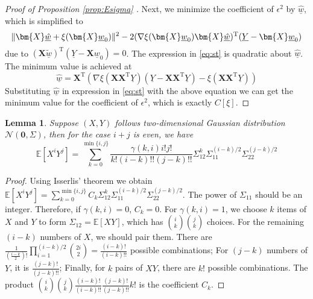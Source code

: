 \documentclass[conference]{IEEEtran}
\newtheorem{lemma}{Lemma}
\DeclarePairedDelimiter\norm{\lVert}{\rVert}
\def\E{\mathbb{E}}
\def\T{\mathrm{T}}
\newcommand{\ide}[2]{ \gamma(#1,#2) }
\begin{document}
\begin{proof}[Proof of Proposition \ref{prop:Esigma} ]
Next, we minimize the coefficient of $\epsilon^2$ by $\underline{\hat{w}}$, which is simplified to 
\begin{equation}\label{eq:st}
\norm{\bm{X}\underline{\hat{w}} + \xi(\bm{X} \underline{w}_0)}^2-
2 (
\nabla \xi(\bm{X} \underline{w}_0)\bm{X}\underline{\hat{w}})^\T(\underline{Y}-\bm{X} \underline{w}_0)
\end{equation}
due to $(\bm{X}\underline{\tilde{w}})^\T (\underline{Y}-\bm{X}\underline{w}_0) = 0 $.
The expression in \eqref{eq:st} is quadratic about $\underline{\hat{w}}$. The minimum value is achieved  at
$$
\underline{\hat{w}} =  \bm{X}^\T(\nabla\xi(\bm{X}\bm{X}^\T \underline{Y})
(\underline{Y}-\bm{X}\bm{X}^\T \underline{Y}) - \xi(\bm{X}\bm{X}^\T \underline{Y}))
$$
Substituting $\underline{\hat{w}}$ in expression in \eqref{eq:st} with the above equation we can get the minimum value for the coefficient of $\epsilon^2$, which is exactly $C[\xi]$.
\end{proof}
\begin{lemma}\label{lemma:Isserlis2}
     Suppose $(X,Y)$ follows two-dimensional Gaussian distribution $\mathcal{N}(\bm{0}, \Sigma)$, then for the case $i+j$ is even, we have
\begin{equation*}
    \E[X^i Y^j] =
    \sum_{k=0}^{\min\{i,j\}}
    \frac{\ide{k}{i} i! j!}{k! (i-k)!!(j-k)!!}
    \Sigma_{12}^k \Sigma_{11}^{(i-k)/2}\Sigma_{22}^{(j-k)/2}
\end{equation*}
\end{lemma}
\begin{proof}
Using Isserlis' theorem \cite{isserlis1918formula} we obtain
$  \E[X^i Y^j] = \sum_{k=0}^{\min\{i,j\}} C_k \Sigma_{12}^k \Sigma_{11}^{(i-k)/2}\Sigma_{22}^{(j-k)/2}$.
The power of $\Sigma_{11}$ should be an integer. Therefore, if $\ide{k}{i} = 0$, $C_k = 0$.
For $\ide{k}{i} = 1$, we choose $k$ items of $X$ and $Y$ to form $\Sigma_{12} = \E[XY]$, which has $\binom{i}{k}\binom{j}{k}$ choices.
For the remaining $(i-k)$ numbers of $X$, we should pair them. There are $\frac{1}{(\frac{i-k}{2})!}\prod_{i=1}^{(i-k)/2} \binom{2i}{2} = \frac{(i-k)!}{(i-k)!!}$ possible combinations; For $(j-k)$ numbers of $Y$, it is $\frac{(j-k)!}{(j-k)!!}$; Finally, for $k$ pairs of $XY$, there are $k!$ possible combinations. The product $\binom{i}{k}\binom{j}{k}\frac{(i-k)!}{(i-k)!!}\frac{(j-k)!}{(j-k)!!}k!$ is the coefficient $C_k$.
\end{proof}
\end{document}
